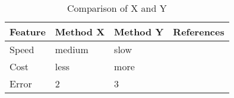 \setlength{\tabcolsep}{0.5em} %
\renewcommand{\arraystretch}{2} %
\begin{table}[ht!]
  \centering
  \begin{tabularx}{0.9\textwidth}{|p{8em}|p{6em}p{6em}X|}
    \hline
    \textbf{Feature}     & \textbf{Method X}      & \textbf{Method Y}                           & \textbf{References}                      \\
    \hline
    \rowcolor[HTML]{EFEFEF}
    Speed                     &  medium     &  slow          &       \citet{Skoltech2017}             \\
    \hline
    Cost                        & less            & more          &                                  \\
    \hline
    \rowcolor[HTML]{EFEFEF}
    Error                      &        2           &                   3                   &                                         \\
    \hline
  \end{tabularx}
    \caption{Comparison of X and Y}
    \label{tab:test}%
\end{table}